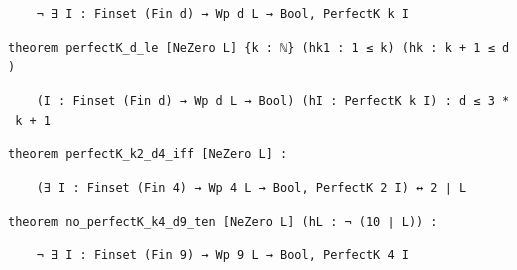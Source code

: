 \documentclass[11pt,a4paper]{article}
\theoremstyle{named}
\begin{document}
\begin{leancode}
\item \texttt{\ \allowbreak{}\ \allowbreak{}\ \allowbreak{}\ \allowbreak{}¬\ \allowbreak{}∃\ \allowbreak{}I\ \allowbreak{}:\ \allowbreak{}Finset\ \allowbreak{}(Fin\ \allowbreak{}d)\ \allowbreak{}→\ \allowbreak{}Wp\ \allowbreak{}d\ \allowbreak{}L\ \allowbreak{}→\ \allowbreak{}Bool,\ \allowbreak{}PerfectK\ \allowbreak{}k\ \allowbreak{}I}
\smallskip
\item \texttt{theorem\ \allowbreak{}perfectK\_\allowbreak{}d\_\allowbreak{}le\ \allowbreak{}[NeZero\ \allowbreak{}L]\ \allowbreak{}\{k\ \allowbreak{}:\ \allowbreak{}ℕ\}\ \allowbreak{}(hk1\ \allowbreak{}:\ \allowbreak{}1\ \allowbreak{}≤\ \allowbreak{}k)\ \allowbreak{}(hk\ \allowbreak{}:\ \allowbreak{}k\ \allowbreak{}+\ \allowbreak{}1\ \allowbreak{}≤\ \allowbreak{}d)}
\item \texttt{\ \allowbreak{}\ \allowbreak{}\ \allowbreak{}\ \allowbreak{}(I\ \allowbreak{}:\ \allowbreak{}Finset\ \allowbreak{}(Fin\ \allowbreak{}d)\ \allowbreak{}→\ \allowbreak{}Wp\ \allowbreak{}d\ \allowbreak{}L\ \allowbreak{}→\ \allowbreak{}Bool)\ \allowbreak{}(hI\ \allowbreak{}:\ \allowbreak{}PerfectK\ \allowbreak{}k\ \allowbreak{}I)\ \allowbreak{}:\ \allowbreak{}d\ \allowbreak{}≤\ \allowbreak{}3\ \allowbreak{}*\ \allowbreak{}k\ \allowbreak{}+\ \allowbreak{}1}
\smallskip
\item \texttt{theorem\ \allowbreak{}perfectK\_\allowbreak{}k2\_\allowbreak{}d4\_\allowbreak{}iff\ \allowbreak{}[NeZero\ \allowbreak{}L]\ \allowbreak{}:}
\item \texttt{\ \allowbreak{}\ \allowbreak{}\ \allowbreak{}\ \allowbreak{}(∃\ \allowbreak{}I\ \allowbreak{}:\ \allowbreak{}Finset\ \allowbreak{}(Fin\ \allowbreak{}4)\ \allowbreak{}→\ \allowbreak{}Wp\ \allowbreak{}4\ \allowbreak{}L\ \allowbreak{}→\ \allowbreak{}Bool,\ \allowbreak{}PerfectK\ \allowbreak{}2\ \allowbreak{}I)\ \allowbreak{}↔\ \allowbreak{}2\ \allowbreak{}∣\ \allowbreak{}L}
\smallskip
\item \texttt{theorem\ \allowbreak{}no\_\allowbreak{}perfectK\_\allowbreak{}k4\_\allowbreak{}d9\_\allowbreak{}ten\ \allowbreak{}[NeZero\ \allowbreak{}L]\ \allowbreak{}(hL\ \allowbreak{}:\ \allowbreak{}¬\ \allowbreak{}(10\ \allowbreak{}∣\ \allowbreak{}L))\ \allowbreak{}:}
\item \texttt{\ \allowbreak{}\ \allowbreak{}\ \allowbreak{}\ \allowbreak{}¬\ \allowbreak{}∃\ \allowbreak{}I\ \allowbreak{}:\ \allowbreak{}Finset\ \allowbreak{}(Fin\ \allowbreak{}9)\ \allowbreak{}→\ \allowbreak{}Wp\ \allowbreak{}9\ \allowbreak{}L\ \allowbreak{}→\ \allowbreak{}Bool,\ \allowbreak{}PerfectK\ \allowbreak{}4\ \allowbreak{}I}

\end{leancode}
\end{document}
